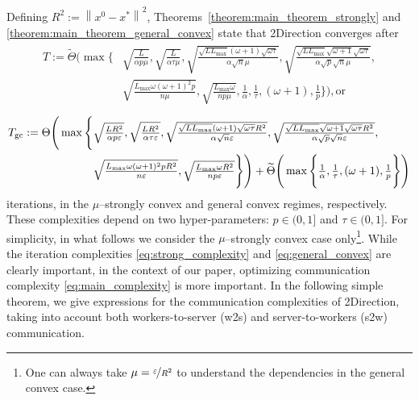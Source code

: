 \documentclass{article} %
\newcommand{\norm}[1]{\left\| #1 \right\|}
\theoremstyle{plain}
\theoremstyle{definition}
\theoremstyle{remark}
\newcommand{\eqdef}{:=}
\newcommand{\squeeze}{\textstyle}
\newcommand{\green}{\color{mydarkgreen}}
\newcommand{\algname}[1]{{\small\green\sf #1}}
\begin{document}
Defining $R^2 \eqdef \norm{x^0 - x^*}^2$, Theorems~\ref{theorem:main_theorem_strongly} and \ref{theorem:main_theorem_general_convex}  state that \algname{2Direction} converges after
\begin{eqnarray}
\begin{aligned}
  \label{eq:strong_complexity}
 \squeeze T \eqdef \widetilde{\Theta}\Bigg(\max\Bigg\{&\squeeze\sqrt{\frac{L}{\alpha p \mu}},\sqrt{\frac{L}{\alpha \tau \mu}},\sqrt{\frac{\sqrt{L L_{\max}} (\omega + 1) \sqrt{\omega \tau}}{\alpha \sqrt{n} \mu}},\sqrt{\frac{\sqrt{L L_{\max}} \sqrt{\omega + 1} \sqrt{\omega \tau}}{\alpha \sqrt{p} \sqrt{n} \mu}}, \\
  &\squeeze\sqrt{\frac{L_{\max} \omega (\omega + 1)^2 p}{n \mu}}, \sqrt{\frac{L_{\max} \omega}{n p \mu}}, \frac{1}{\alpha}, \frac{1}{\tau}, (\omega + 1), \frac{1}{p}\Bigg\}\Bigg), \text{or}
\end{aligned}
\end{eqnarray}
\begin{eqnarray}
\begin{aligned}
  \label{eq:general_convex}
\squeeze  T_{\textnormal{gc}} \eqdef \Theta\Bigg(\max\Bigg\{&\squeeze\sqrt{\frac{L R^2}{\alpha p \varepsilon}},\sqrt{\frac{L R^2}{\alpha \tau \varepsilon}},\sqrt{\frac{\sqrt{L L_{\max}} (\omega + 1) \sqrt{\omega \tau} R^2}{\alpha \sqrt{n} \varepsilon}},\sqrt{\frac{\sqrt{L L_{\max}} \sqrt{\omega + 1} \sqrt{\omega \tau} R^2}{\alpha \sqrt{p} \sqrt{n} \varepsilon}}, \\
  &\squeeze\sqrt{\frac{L_{\max} \omega (\omega + 1)^2 p R^2}{n \varepsilon}}, \sqrt{\frac{L_{\max} \omega R^2}{n p \varepsilon}}\Bigg\}\Bigg) + \widetilde{\Theta}\Bigg(\max\Bigg\{\frac{1}{\alpha}, \frac{1}{\tau}, (\omega + 1), \frac{1}{p}\Bigg\}\Bigg)
\end{aligned}
\end{eqnarray}
iterations, in the $\mu$--strongly convex and general convex regimes, respectively. These complexities depend on two hyper-parameters: $p \in (0, 1]$ and $\tau \in (0, 1].$ For simplicity, in what follows we consider the $\mu$--strongly convex case only\footnote{One can always take $\mu = \nicefrac{\varepsilon}{R^2}$ to understand the dependencies in the general convex case.}.
While the iteration complexities \eqref{eq:strong_complexity} and \eqref{eq:general_convex} are clearly important, in the context of our paper, optimizing communication complexity \eqref{eq:main_complexity} is more important. In the following simple theorem, we give expressions for the communication complexities of \algname{2Direction}, taking into account both workers-to-server (w2s) and server-to-workers (s2w) communication.
\end{document}
